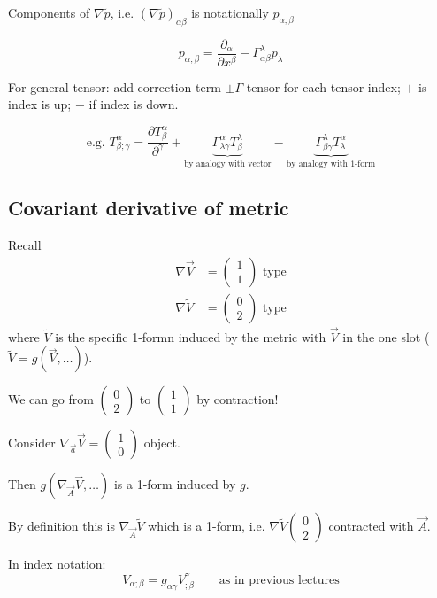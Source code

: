 \documentclass[a4paper]{article} %
\newcommand{\pmx}[1]{
\begin{pmatrix}
#1
\end{pmatrix}
}
\renewcommand{\tilde}{\widetilde}
\begin{document}
Components of $\nabla\tilde{p}$, i.e. $(\nabla\tilde{p})_{\alpha\beta}$ is notationally $p_{\alpha;\beta}$

\begin{equation}
p_{\alpha;\beta}=\frac{\partial_{\alpha}}{\partial x^{\beta}}-\Gamma^{\lambda}_{\alpha\beta} p_{\lambda}
\end{equation}

For general tensor: add correction term $\pm \Gamma$ tensor for each tensor index; $+$ is index is up; $-$ if index is down.

\begin{equation}
\text{e.g. } T^{\alpha}_{\beta;\gamma}=\frac{\partial T^{\alpha}_{\beta}}{\partial^{\gamma}}
+\underbrace{\Gamma^{\alpha}_{\lambda\gamma} T^{\lambda}_{\beta}}_{\text{by analogy with vector}}
-\underbrace{\Gamma^{\lambda}_{\beta \gamma}T^{\alpha}_{\lambda}}_{\text{by analogy with 1-form}}
\end{equation}

\subsection{Covariant derivative of metric}

Recall
\begin{align}
\nabla \vec{V}&=\pmx{1\\1}\text{ type}\\
\nabla \tilde{V}&=\pmx{0\\2}\text{ type}
\end{align}
where $\tilde{V}$ is the specific 1-formn induced by the metric with $\vec{V}$ in the one slot ($\tilde{V}=g(\vec{V},\ldots)$).

We can go from $\pmx{0\\2}$ to $\pmx{1\\1}$ by contraction! 

Consider $\nabla_{\vec{a}}\vec{V}=\pmx{1\\0}$ object. 

Then $g(\nabla_{\vec{A}}\vec{V},\ldots)$ is a 1-form induced by $g$. 

By definition this is $\nabla_{\vec{A}}\tilde{V}$ which is a 1-form, i.e. $\nabla\tilde{V}\pmx{0\\2}$ contracted with $\vec{A}$. 

In index notation:
\begin{equation}
V_{\alpha;\beta}=g_{\alpha\gamma}V^{\gamma}_{;\beta}\qquad\text{as in previous lectures}
\end{equation}
\end{document}
